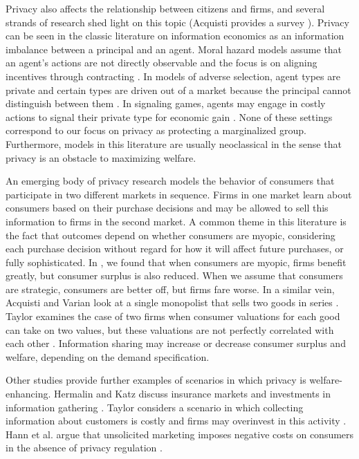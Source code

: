 Privacy also affects the relationship between citizens and firms, and several strands of research shed light on this topic (Acquisti provides a survey \cite{acquisti2010economics}).  Privacy can be seen in the classic literature on information economics as an information imbalance between a principal and an agent.  Moral hazard models assume that an agent's actions are not directly observable and the focus is on aligning incentives through contracting \cite{holmstrom1979moral}\cite{stiglitz1981credit}.  In models of adverse selection, agent types are private and certain types are driven out of a market because the principal cannot distinguish between them \cite{akerlof1995market}.  In signaling games, agents may engage in costly actions to signal their private type for economic gain \cite{spence1973job}.  None of these settings correspond to our focus on privacy as protecting a marginalized group.  Furthermore, models in this literature are usually neoclassical in the sense that privacy is an obstacle to maximizing welfare. 

An emerging body of privacy research models the behavior of consumers that participate in two different markets in sequence.  Firms in one market learn about consumers based on their purchase decisions and may be allowed to sell this information to firms in the second market.  A common theme in this literature is the fact that outcomes depend on whether consumers are myopic, considering each purchase decision without regard for how it will affect future purchases, or fully sophisticated.  In \cite{johnsoncaviar}, we found that when consumers are myopic, firms benefit greatly, but consumer surplus is also reduced. When we assume that consumers are strategic, consumers are better off, but firms fare worse.  In a similar vein, Acquisti and Varian look at a single monopolist that sells two goods in series \cite{acquisti2005conditioning}.  Taylor examines the case of two firms when consumer valuations for each good can take on two values, but these valuations are not perfectly correlated with each other \cite{taylor2004consumer}.  Information sharing may increase or decrease consumer surplus and welfare, depending on the demand specification.  

Other studies provide further examples of scenarios in which privacy is welfare-enhancing.  Hermalin and Katz discuss insurance markets and investments in information gathering \cite{hermalin2006privacy}.  Taylor considers a scenario in which collecting information about customers is costly and firms may overinvest in this activity \cite{taylor2003privacy}.  Hann et al. argue that unsolicited marketing imposes negative costs on consumers in the absence of privacy regulation \cite{hann2008consumer}.

